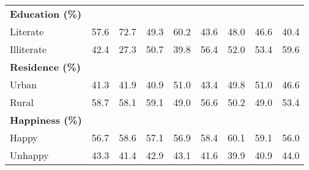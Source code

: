 \documentclass[12pt, a4paper]{article}
\begin{document}
\begin{appendices}
\begin{table}[!h]
{\begin{tabular}{lcccccccc}
        \midrule
        \textbf{Education (\%)}                                                                                                                                                                                                                                    \\
        \quad Literate     & 57.6                                & 72.7                                & 49.3                                & 60.2                                & 43.6              & 48.0              & 46.6              & 40.4              \\
        \quad Illiterate   & 42.4                                & 27.3                                & 50.7                                & 39.8                                & 56.4              & 52.0              & 53.4              & 59.6              \\
        \midrule
        \textbf{Residence (\%)}                                                                                                                                                                                                                                    \\
        \quad Urban        & 41.3                                & 41.9                                & 40.9                                & 51.0                                & 43.4              & 49.8              & 51.0              & 46.6              \\
        \quad Rural        & 58.7                                & 58.1                                & 59.1                                & 49.0                                & 56.6              & 50.2              & 49.0              & 53.4              \\
        \midrule
        \textbf{Happiness (\%)}                                                                                                                                                                                                                                    \\
        \quad Happy        & 56.7                                & 58.6                                & 57.1                                & 56.9                                & 58.4              & 60.1              & 59.1              & 56.0              \\
        \quad Unhappy      & 43.3                                & 41.4                                & 42.9                                & 43.1                                & 41.6              & 39.9              & 40.9              & 44.0              \\

\end{tabular}}
\end{table}
\end{appendices}
\end{document}
